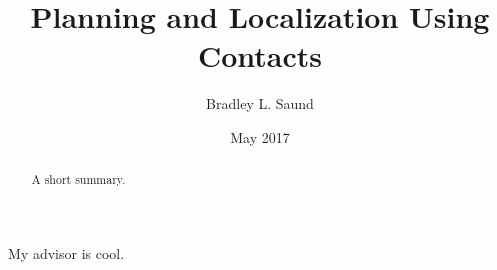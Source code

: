 \documentclass[hidelinks, 12pt]{cmuthesis}
\begin{document}
 
\frontmatter

\pagestyle{empty}

\title{ %
{\bf Planning and Localization Using Contacts}}
\author{Bradley L. Saund}
\date{May 2017}
\trnumber{}


\support{}
\disclaimer{}


\keywords{}

\maketitle

\begin{dedication}

\end{dedication}

\pagestyle{plain} %


\begin{abstract}
A short summary.
\end{abstract}

\begin{acknowledgments}
My advisor is cool.
\end{acknowledgments}



\tableofcontents
\listoffigures
\listoftables

\mainmatter


%
%
%
%
%
\end{document}
